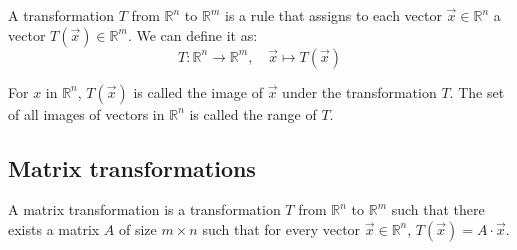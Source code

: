 \begin{definition}[transformation]
    A transformation $T$ from $\mathbb{R}^n$ to $\mathbb{R}^m$ is a rule that assigns to each vector $\vec{x} \in \mathbb{R}^n$ a vector $T(\vec{x}) \in \mathbb{R}^m$. We can define it as:
    \[
        T: \mathbb{R}^n \to \mathbb{R}^m, \quad \vec{x} \mapsto T(\vec{x})
    \]
\end{definition}
For $x$ in $\mathbb{R}^n$, $T(\vec{x})$ is called the image of $\vec{x}$ under the transformation $T$. The set of all images of vectors in $\mathbb{R}^n$ is called the range of $T$.

\subsection{Matrix transformations}
\begin{definition}
    A matrix transformation is a transformation $T$ from $\mathbb{R}^n$ to $\mathbb{R}^m$ such that there exists a matrix $A$ of size $m \times n$ such that for every vector $\vec{x} \in \mathbb{R}^n$, $T(\vec{x}) = A \cdot \vec{x}$.
\end{definition}

